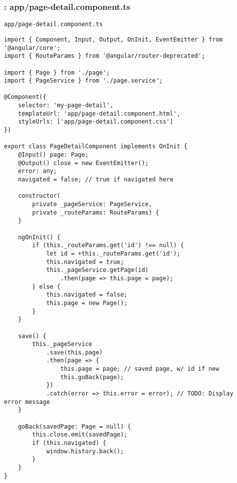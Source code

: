 \documentclass[11pt]{article}
\begin{document}
\subsubsection{: app/page-detail.component.ts}
\label{sec-2-5-3}
\begin{verbatim}
app/page-detail.component.ts
\end{verbatim}
\begin{verbatim}
import { Component, Input, Output, OnInit, EventEmitter } from '@angular/core';
import { RouteParams } from '@angular/router-deprecated';

import { Page } from './page';
import { PageService } from './page.service';

@Component({
    selector: 'my-page-detail',
    templateUrl: 'app/page-detail.component.html',
    styleUrls: ['app/page-detail.component.css']
})

export class PageDetailComponent implements OnInit {
    @Input() page: Page;
    @Output() close = new EventEmitter();
    error: any;
    navigated = false; // true if navigated here

    constructor(
        private _pageService: PageService,
        private _routeParams: RouteParams) {
    }

    ngOnInit() {
        if (this._routeParams.get('id') !== null) {
            let id = +this._routeParams.get('id');
            this.navigated = true;
            this._pageService.getPage(id)
                .then(page => this.page = page);
        } else {
            this.navigated = false;
            this.page = new Page();
        }
    }

    save() {
        this._pageService
            .save(this.page)
            .then(page => {
                this.page = page; // saved page, w/ id if new
                this.goBack(page);
            })
            .catch(error => this.error = error); // TODO: Display error message
    }

    goBack(savedPage: Page = null) {
        this.close.emit(savedPage);
        if (this.navigated) {
            window.history.back();
        }
    }
}
\end{verbatim}
\end{document}
